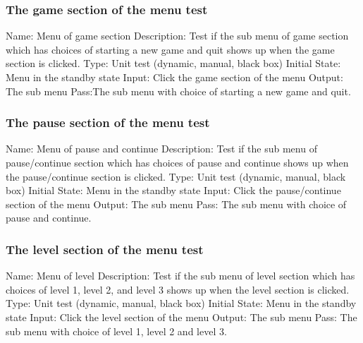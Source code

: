 \documentclass{article}
\begin{document}
\subsubsection{The game section of the menu test}
Name: Menu of game section\newline
Description: Test if the sub menu of game section which has choices of 
starting a new game and quit shows up when the game section is clicked. 
\newline
Type: Unit test (dynamic, manual, black box) \newline
Initial State: Menu in the standby state \newline
Input: Click the game section of the menu \newline
Output: The sub menu \newline
Pass:The sub menu with choice of starting a new game and quit. \newline

\subsubsection{The pause section of the menu test}
Name: Menu of pause and continue\newline
Description: Test if the sub menu of pause/continue section which has choices 
of pause and continue shows up when the pause/continue section is clicked. 
\newline
Type: Unit test (dynamic, manual, black box) \newline
Initial State:  Menu in the standby state \newline
Input: Click the pause/continue section of the menu \newline
Output: The sub menu  \newline
Pass: The sub menu with choice of pause and continue. \newline

\subsubsection{The level section of the menu test}
Name:  Menu of level\newline
Description: Test if the sub menu of level section which has choices of level 
1, level 2, and level 3 shows up when the level section is clicked. \newline
Type: Unit test (dynamic, manual, black box) \newline
Initial State: Menu in the standby state \newline
Input: Click the level section of the menu\newline
Output: The sub menu\newline
Pass: The sub menu with choice of level 1, level 2 and level 3. \newline
\end{document}
